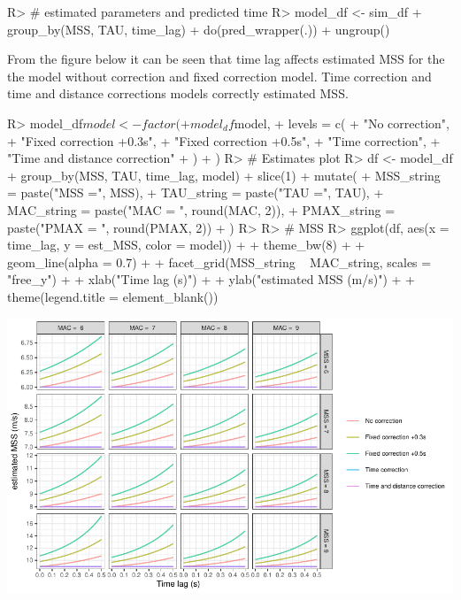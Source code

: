 \documentclass[
]{jss}
\begin{document}
\begin{CodeChunk}
\begin{CodeInput}
R> # estimated parameters and predicted time
R> model_df <- sim_df %
+   group_by(MSS, TAU, time_lag) %
+   do(pred_wrapper(.)) %
+   ungroup()
\end{CodeInput}
\end{CodeChunk}

From the figure below it can be seen that time lag affects estimated MSS for the the model without correction and fixed correction model. Time correction and time and distance corrections models correctly estimated MSS.

\begin{CodeChunk}
\begin{CodeInput}
R> model_df$model <- factor(
+   model_df$model,
+   levels = c(
+     "No correction",
+     "Fixed correction +0.3s",
+     "Fixed correction +0.5s",
+     "Time correction",
+     "Time and distance correction"
+   )
+ )
R> # Estimates plot
R> df <- model_df %
+   group_by(MSS, TAU, time_lag, model) %
+   slice(1) %
+   mutate(
+     MSS_string = paste("MSS =", MSS),
+     TAU_string = paste("TAU =", TAU),
+     MAC_string = paste("MAC = ", round(MAC, 2)),
+     PMAX_string = paste("PMAX = ", round(PMAX, 2))
+   )
R> 
R> # MSS
R> ggplot(df, aes(x = time_lag, y = est_MSS, color = model)) +
+   theme_bw(8) +
+   geom_line(alpha = 0.7) +
+   facet_grid(MSS_string ~ MAC_string, scales = "free_y") +
+   xlab("Time lag (s)") +
+   ylab("estimated MSS (m/s)") +
+   theme(legend.title = element_blank())
\end{CodeInput}


\begin{center}\includegraphics[width=1\linewidth]{paper_files/figure-latex/unnamed-chunk-43-1} \end{center}

\end{CodeChunk}
\end{document}

